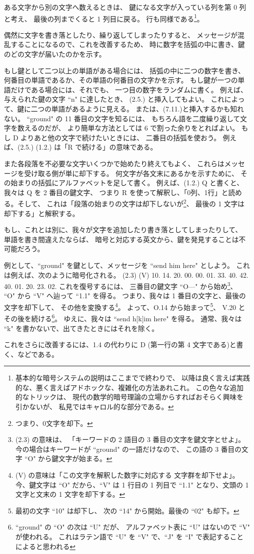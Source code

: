 \documentclass{article}
\begin{document}
ある文字から別の文字へ数えるときは、
鍵になる文字が入っている列を第 0 列と考え、
最後の列までくると 1 列目に戻る。
行も同様である\footnote{基本的な暗号システムの説明はここまでで終わりで、
以降は良く言えば実践的な、悪く言えばアドホックな、複雑化の方法あれこれ。
この色々な追加的なトリックは、
現代の数学的暗号理論の立場からすればおそらく興味を引かないが、
私見ではキャロル的な部分である。
}。

偶然に文字を書き落としたり、繰り返してしまったりすると、
メッセージが混乱することになるので、これを改善するため、
時に数字を括弧の中に書き、鍵のどの文字が届いたのかを示す。

もし鍵として二つ以上の単語がある場合には、
括弧の中に二つの数字を書き、
何番目の単語であるか、その単語の何番目の文字かを示す。
もし鍵が一つの単語だけである場合には、それでも、
一つ目の数字をランダムに書く。
例えば、与えられた鍵の文字 ``n" に達したとき、
(2.5.) と挿入してもよい。
これによって、鍵に二つの単語があるように見える。
または、(7.11.)と挿入するかも知れない。
``ground" の 11 番目の文字を知るには、
もちろん語を二度繰り返して文字を数えるのだが、
より簡単な方法としては 6 で割った余りをとればよい。
もし D よりあと他の文字で続けたいときには、
二番目の括弧を使おう。
例えば、(2.5.) (1.2.) は「R で続ける」の意味である。

また各段落を不必要な文字いくつかで始めたり終えてもよく、
これらはメッセージを受け取る側が単に却下する。
何文字が各文末にあるかを示すために、
その始まりの括弧にアルファベットを足して書く。
例えば、(1.2.) Q と書くと、我々は Q を 2 番目の鍵文字、
つまり R を使って解釈し、「0列、1行」と読める。そして、
これは「段落の始まりの文字は却下しないが\footnote{つまり、0文字を却下。}、
最後の 1 文字は却下する」と解釈する。

もし、これとは別に、我々が文字を追加したり書き落としてしまったりして、
単語を書き間違えたならば、
暗号と対応する英文から、鍵を発見することは不可能だろう。

例として、``ground" を鍵として、メッセージを ``send him here" としよう。
これは例えば、次のように暗号化される。
(2.3) (V) 10. 14. 20. 00. 00. 01. 33. 40. 42. 40. 01. 20. 23. 02.
これを復号するには、
三番目の鍵文字 ``O---" から始め\footnote{(2.3) の意味は、
「キーワードの 2 語目の 3 番目の文字を鍵文字とせよ」。
今の場合はキーワードが ``ground" の一語だけなので、
この語の 3 番目の文字 ``O" から鍵文字が始まる。}、
``O" から ``V" へ辿って ``1.1" を得る。
つまり、我々は 1 番目の文字と、最後の文字を却下して、
その他を変換する\footnote{(V) の意味は「この文字を解釈した数字に対応する
文字群を却下せよ」。今、鍵文字は ``O" だから、``V" は 1 行目の 1 列目で
``1.1" となり、文頭の 1 文字と文末の 1 文字を却下する。}。
よって、O.14 から始まって\footnote{最初の文字 ``10" は却下し、
次の ``14" から開始。最後の ``02" も却下。}、
V.20 とその後を続ける\footnote{``ground" の ``O" の次は ``U" だが、
アルファベット表に ``U" はないので ``V" が使われる。
これはラテン語で ``U" を ``V" で、``J" を ``I"
で表記することによると思われる}。
ゆえに、我々は ``send h[k]im here" を得る。
通常、我々は ``k" を書かないで、出てきたときにはそれを除く。

これをさらに改善するには、1.4 の代わりに
D (第一行の第 4 文字である)と書く、などである。
\end{document}
